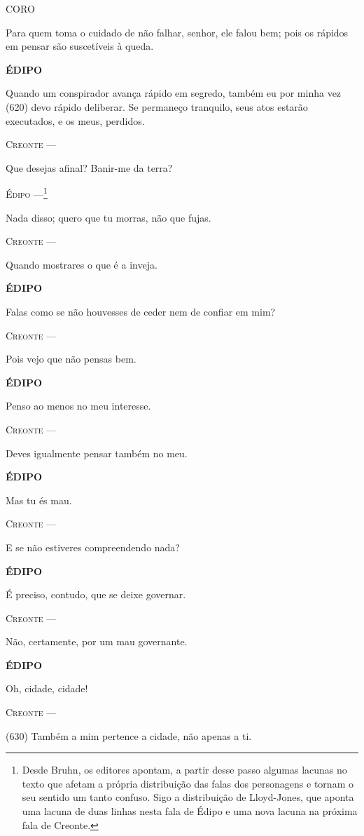 \textsc{CORO}

Para quem toma o cuidado de não falhar, senhor, ele falou bem; pois os
rápidos em pensar são suscetíveis à queda.

\textbf{ÉDIPO }

Quando um conspirador avança rápido em segredo, também eu por minha vez
(620) devo rápido deliberar. Se permaneço tranquilo, seus atos estarão
executados, e os meus, perdidos.

\textsc{Creonte} ---

Que desejas afinal? Banir-me da terra?

\textsc{Édipo} ---\footnote{Desde Bruhn, os editores apontam, a partir desse
  passo algumas lacunas no texto que afetam a própria distribuição das
  falas dos personagens e tornam o seu sentido um tanto confuso. Sigo a
  distribuição de Lloyd-Jones, que aponta uma lacuna de duas linhas
  nesta fala de Édipo e uma nova lacuna na próxima fala de Creonte.}

Nada disso; quero que tu morras, não que fujas.

\textsc{Creonte} ---

Quando mostrares o que é a inveja.

\textbf{ÉDIPO }

Falas como se não houvesses de ceder nem de confiar em mim?

\textsc{Creonte} ---

Pois vejo que não pensas bem.

\textbf{ÉDIPO }

Penso ao menos no meu interesse.

\textsc{Creonte} ---

Deves igualmente pensar também no meu.

\textbf{ÉDIPO }

Mas tu és mau.

\textsc{Creonte} ---

E se não estiveres compreendendo nada?

\textbf{ÉDIPO }

É preciso, contudo, que se deixe governar.

\textsc{Creonte} ---

Não, certamente, por um mau governante.

\textbf{ÉDIPO }

Oh, cidade, cidade!

\textsc{Creonte} ---

(630) Também a mim pertence a cidade, não apenas a ti.

